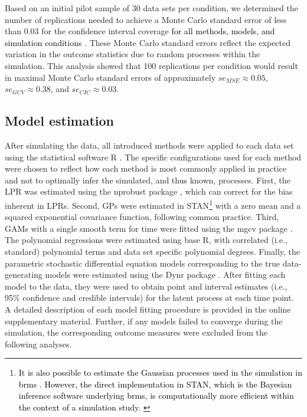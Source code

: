 \documentclass[man, floatsintext]{apa7}
\begin{document}
Based on an initial pilot sample of 30 data sets per condition, we determined
the number of replications needed to achieve a Monte Carlo standard error of
less than 0.03 for the confidence interval coverage \textcolor{black}{for all
  methods, models, and simulation conditions}
\parencite{siepe_simulation_2023}. These Monte Carlo standard errors reflect
the expected variation in the outcome statistics due to random processes within
the simulation. This analysis showed that 100 replications per condition
would result in maximal Monte Carlo standard errors of approximately $se_{MSE}
  \approx 0.05$, $se_{GCV} \approx 0.38$, and $se_{CIC} \approx 0.03$.

\subsection{Model estimation}

After simulating the data, all introduced methods were applied to each data set
using the statistical software R \parencite{R-base}. The specific
configurations used for each method were chosen to reflect how each method is
most commonly applied in practice and not to optimally infer the simulated, and
thus known, processes. First, the LPR was estimated using the nprobust package
\parencite{R-nprobust}, which can correct for the bias inherent in LPRs.
Second, GPs were estimated in STAN\footnote{\textcolor{black}{
    It is also possible to estimate the
    Gaussian processes used in the simulation in brms
    \parencite{burkner_brms_2017}.
    However,
    the direct implementation in STAN, which is the Bayesian inference software
    underlying brms, is computationally more efficient within the context of a
    simulation study.
  }}
\parencite{R-cmdstanr} with a zero mean and a squared exponential covariance
function, following common practice. Third, GAMs with a single smooth term for
time were fitted using the mgcv package \parencite{R-mgcv_a}. The polynomial
regressions were estimated using base R, with correlated (i.e., standard)
polynomial terms and data set specific polynomial degrees. Finally, the
parametric stochastic differential equation models corresponding to the true
data-generating models were estimated using the Dynr package
\parencite{R-dynr}. After fitting each model to the data, they were used to
obtain point and interval estimates (i.e., 95\% confidence and credible
intervals) for the latent process at each time point. A detailed description of
each model fitting procedure is provided in the online supplementary material.
Further, if any models failed to converge during the simulation, the
corresponding outcome measures were excluded from the following analyses.
\end{document}
